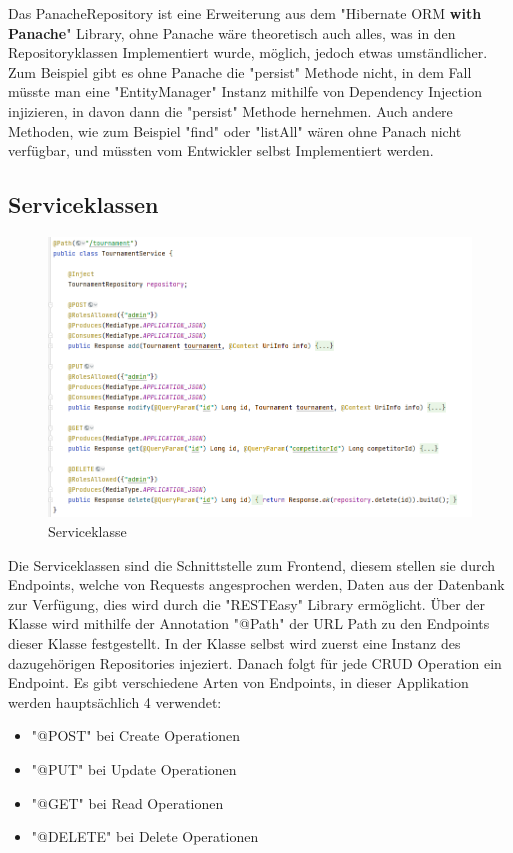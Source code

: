 Das PanacheRepository ist eine Erweiterung aus dem "Hibernate ORM \textbf{with Panache}" Library, ohne Panache wäre theoretisch auch alles, was in den Repositoryklassen Implementiert wurde, möglich, jedoch etwas umständlicher.
Zum Beispiel gibt es ohne Panache die "persist" Methode nicht, in dem Fall müsste man eine "EntityManager" Instanz mithilfe von Dependency Injection injizieren, in davon dann die "persist" Methode hernehmen.
Auch andere Methoden, wie zum Beispiel "find" oder "listAll" wären ohne Panach nicht verfügbar, und müssten vom Entwickler selbst Implementiert werden.

\subsection{Serviceklassen}

\begin{figure}[H]
    \includegraphics[scale=0.6]{pics/backend/service_class.png}
    \caption{Serviceklasse}
\end{figure}

Die Serviceklassen sind die Schnittstelle zum Frontend, diesem stellen sie durch Endpoints, welche von Requests angesprochen werden, Daten aus der Datenbank zur Verfügung, dies wird durch die "RESTEasy" Library ermöglicht.
Über der Klasse wird mithilfe der Annotation "@Path" der URL Path zu den Endpoints dieser Klasse festgestellt. In der Klasse selbst wird zuerst eine Instanz des dazugehörigen Repositories injeziert. 
Danach folgt für jede CRUD Operation ein Endpoint. Es gibt verschiedene Arten von Endpoints, in dieser Applikation werden hauptsächlich 4 verwendet:

\begin{itemize}
    \item "@POST" bei Create Operationen
    \item "@PUT" bei Update Operationen
    \item "@GET" bei Read Operationen
    \item "@DELETE" bei Delete Operationen
\end{itemize}

